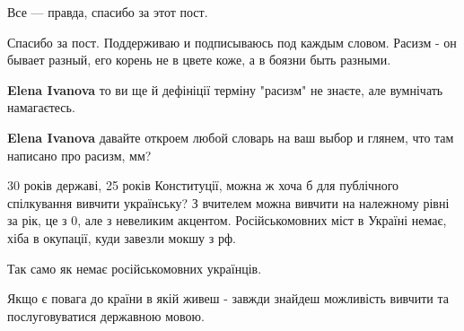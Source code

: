 \begin{itemize}
 
Все — правда, спасибо за этот пост.

 

Спасибо за пост. Поддерживаю и подписываюсь под каждым словом. Расизм - он
бывает разный, его корень не в цвете коже, а в боязни быть разными.

\begin{itemize}
 
\textbf{Elena Ivanova} то ви ще й дефініції терміну "расизм" не знаєте, але вумнічать намагаєтесь.

 
\textbf{Elena Ivanova} давайте откроем любой словарь на ваш выбор и глянем, что там написано про расизм, мм?
\end{itemize}

 

30 років державі, 25 років Конституції, можна ж хоча б для публічного
спілкування вивчити українську? З вчителем можна вивчити на належному рівні за
рік, це з 0, але з невеликим акцентом. Російськомовних міст в Україні немає,
хіба в окупації, куди завезли мокшу з рф. 

Так само як немає російськомовних українців. 

Якщо є повага до країни в якій живеш - завжди знайдеш можливість вивчити та
послуговуватися державною мовою.


\end{itemize}
